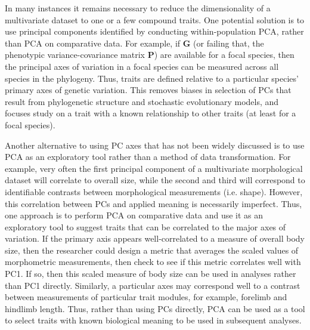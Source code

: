\documentclass[a4paper,12pt]{article}
\begin{document}
In many instances it remains necessary to reduce the dimensionality of a multivariate dataset to one or a few compound traits. One potential solution is to use principal components identified by conducting within-population PCA, rather than PCA on comparative data. For example, if $\mathbf{G}$ (or failing that, the phenotypic variance-covariance matrix $\mathbf{P}$) are available for a focal species, then the principal axes of variation in a focal species can be measured across all species in the phylogeny. Thus, traits are defined relative to a particular species' primary axes of genetic variation. This removes biases in selection of PCs that result from phylogenetic structure and stochastic evolutionary models, and focuses study on a trait with a known relationship to other traits (at least for a focal species). 

Another alternative to using PC axes that has not been widely discussed is to use PCA as an exploratory tool rather than a method of data transformation. For example, very often the first principal component of a multivariate morphological dataset will correlate to overall size, while the second and third will correspond to identifiable contrasts between morphological measurements (i.e. shape). However, this correlation between PCs and applied meaning is necessarily imperfect. Thus, one approach is to perform PCA on comparative data and use it as an exploratory tool to suggest traits that can be correlated to the major axes of variation. If the primary axis appears well-correlated to a measure of overall body size, then the researcher could design a metric that averages the scaled values of morphometric measurements, then check to see if this metric correlates well with PC1. If so, then this scaled measure of body size can be used in analyses rather than PC1 directly. Similarly, a particular axes may correspond well to a contrast between measurements of particular trait modules, for example, forelimb and hindlimb length. Thus, rather than using PCs directly, PCA can be used as a tool to select traits with known biological meaning to be used in subsequent analyses.
\end{document}
